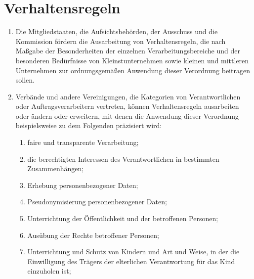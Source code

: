 \chapter{Verhaltensregeln}
\label{ch:40}


\begin{enumerate}

  \item Die Mitgliedstaaten, die Aufsichtsbehörden, der Ausschuss und die Kommission fördern die Ausarbeitung von
   Verhaltensregeln, die nach Maßgabe der Besonderheiten der einzelnen Verarbeitungsbereiche und der besonderen
   Bedürfnisse von Kleinstunternehmen sowie kleinen und mittleren Unternehmen zur ordnungsgemäßen Anwendung dieser
   Verordnung beitragen sollen.
  \label{itm:40-1}

  \item Verbände und andere Vereinigungen, die Kategorien von Verantwortlichen oder Auftragsverarbeitern vertreten,
   können Verhaltensregeln ausarbeiten oder ändern oder erweitern, mit denen die Anwendung dieser Verordnung
   beispielsweise zu dem Folgenden präzisiert wird:
  \label{itm:40-2}

  \begin{enumerate}
  
    \item faire und transparente Verarbeitung;
    \label{itm:40-2a}

    \item die berechtigten Interessen des Verantwortlichen in bestimmten Zusammenhängen;
    \label{itm:40-2b}

    \item Erhebung personenbezogener Daten;
    \label{itm:40-2c}

    \item Pseudonymisierung personenbezogener Daten;
    \label{itm:40-2d}

    \item Unterrichtung der Öffentlichkeit und der betroffenen Personen;
    \label{itm:40-2e}

    \item Ausübung der Rechte betroffener Personen;
    \label{itm:40-2f}

    \item Unterrichtung und Schutz von Kindern und Art und Weise, in der die Einwilligung des Trägers der elterlichen
     Verantwortung für das Kind einzuholen ist;
    \label{itm:40-2g}


\end{enumerate}
\end{enumerate}

